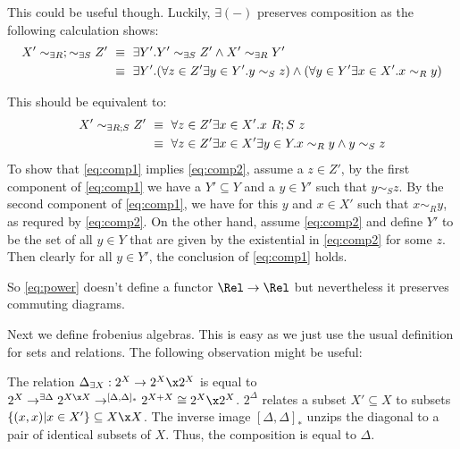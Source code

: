 This could be useful though. Luckily, $\exists {(-)}$ preserves composition
as the following calculation shows:
\begin{align}
X' \sim_{\exists R};\sim_{\exists S} Z'& ~ \equiv ~\exists Y'. Y' \sim_{\exists S} Z' \wedge X' \sim_{\exists R} Y'\notag\\
\label{eq:comp1}  & ~ \equiv ~ \exists Y'.(\forall z\in Z'\exists y\in
Y'. y \sim_S z)\wedge (\forall y\in Y' \exists x \in X'. x \sim_R y) 
\end{align}

%
This should be equivalent to:
\begin{align}
X' \sim_{\exists {R;S}} Z' &~\equiv~ \forall z\in Z' \exists x \in X'. x~ R;S~ z\notag\\
\label{eq:comp2}&~\equiv~ \forall z\in Z' \exists x\in X'\exists y\in Y. x \sim_R y \wedge y \sim_S z
\end{align}
To show that \eqref{eq:comp1} implies \eqref{eq:comp2}, assume a $z \in
Z'$, by the first component of \eqref{eq:comp1} we have a $Y'
\subseteq Y$ and a $y \in Y'$
such that $y \sim_S z$. By the second component of \eqref{eq:comp1},
we have for this $y$ and $x \in X'$ such that $x \sim_R y$, as requred
by \eqref{eq:comp2}. On the other hand, assume \eqref{eq:comp2} and
define $Y'$ to be the set of all $y \in Y$ that are given by the
existential in \eqref{eq:comp2} for some $z$. Then clearly for all $y
\in Y'$, the conclusion of \eqref{eq:comp1} holds. 

So \eqref{eq:power} doesn't define a functor $\Rel \to \Rel$ but
nevertheless it preserves commuting diagrams. 

Next we define frobenius algebras. This is easy as we just use the
usual definition for sets and relations. The following observation
might be useful: 
\begin{remark}
The relation $\Delta_{\exists X} : 2^X
\to 2^X \x 2^X$ is equal to $2^X \to^{\exists \Delta} 2^{X \x X}
\to^{[\Delta,\Delta]_\ast} 2^{X + X} \cong 2^X \x 2^X$.  $2^\Delta$ relates
a subset $X' \subseteq X$ to subsets $\{ (x,x) | x \in X' \}\subseteq
X \x X$. The inverse image ${[\Delta,\Delta]_\ast}$ unzips the diagonal
to a pair of identical subsets of $X$. Thus, the composition is equal
to $\Delta$.
\end{remark}



